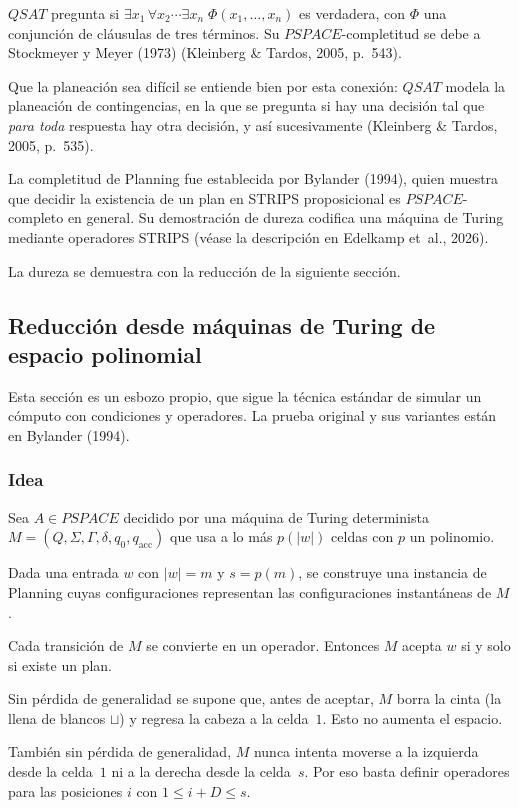 \documentclass[11pt,letterpaper]{article}
\theoremstyle{plain}
\theoremstyle{definition}
\theoremstyle{remark}
\newcommand{\nombreMat}[1]{\ensuremath{\text{\fontencoding{OT1}\fontfamily{cmss}\upshape\selectfont #1}}}
\newcommand{\PSPACE}{\nombreMat{PSPACE}}
\newcommand{\NP}{\nombreMat{NP}}
\newcommand{\coNP}{\nombreMat{co-NP}}
\newcommand{\QSAT}{\nombreMat{QSAT}}
\newcommand{\PLANNING}{\nombreMat{Planning}}
\newcommand{\Path}{\nombreMat{Path}}
\def\PSPACE{PSPACE}\def\NP{NP}\def\coNP{co-NP}%
\def\QSAT{QSAT}\def\PLANNING{Planning}\def\Path{Path}%
\begin{document}
$\QSAT$ pregunta si
$\exists x_1\,\forall x_2\cdots\exists x_n\;
\Phi(x_1,\dots,x_n)$ es verdadera, con $\Phi$
una conjunción de cláusulas de tres términos.
Su $\PSPACE$-completitud se debe a Stockmeyer
y Meyer (1973)
(Kleinberg \& Tardos, 2005, p.~543).

Que la planeación sea difícil se entiende bien
por esta conexión: $\QSAT$ modela la planeación
de contingencias, en la que se pregunta si hay
una decisión tal que \emph{para toda} respuesta
hay otra decisión, y así sucesivamente
(Kleinberg \& Tardos, 2005, p.~535).

La completitud de \PLANNING{} fue establecida por
Bylander (1994), quien muestra que decidir la
existencia de un plan en STRIPS proposicional es
$\PSPACE$-completo en general. Su demostración
de dureza codifica una máquina de Turing mediante
operadores STRIPS
(véase la descripción en Edelkamp et~al., 2026).


La dureza se demuestra con la reducción de la
siguiente sección.


\subsection{Reducción desde máquinas de Turing de espacio polinomial}
\label{sec:reduccion}

Esta sección es un esbozo propio, que sigue la técnica
estándar de simular un cómputo con condiciones
y operadores. La prueba original y sus variantes
están en Bylander (1994).

\subsubsection{Idea}

Sea $A\in\PSPACE$ decidido por una máquina
de Turing determinista
$M=(Q,\Sigma,\Gamma,\delta,q_0,q_{\mathrm{acc}})$
que usa a lo más $p(|w|)$ celdas con $p$ un polinomio.

Dada una entrada $w$ con $|w|=m$ y $s=p(m)$,
se construye una instancia de \PLANNING{}
cuyas configuraciones representan las
configuraciones instantáneas de $M$.

Cada transición de $M$ se convierte en un
operador. Entonces $M$ acepta $w$ si y
solo si existe un plan.

Sin pérdida de generalidad se supone que,
antes de aceptar, $M$ borra la cinta
(la llena de blancos $\sqcup$) y regresa
la cabeza a la celda~$1$. Esto no aumenta
el espacio.


También sin pérdida de generalidad, $M$ nunca intenta
moverse a la izquierda desde la celda~$1$ ni a la derecha
desde la celda~$s$. Por eso basta definir operadores
para las posiciones $i$ con $1\le i+D\le s$.
\end{document}
